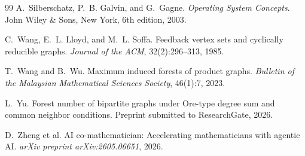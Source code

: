 \documentclass[a4paper]{amsart}
\begin{document}
\begin{thebibliography}{99}
A.~Silberschatz, P.~B. Galvin, and G.~Gagne.
\newblock \emph{Operating System Concepts}.
\newblock John Wiley \& Sons, New York, 6th edition, 2003.

C.~Wang, E.~L. Lloyd, and M.~L. Soffa.
\newblock Feedback vertex sets and cyclically reducible graphs.
\newblock \emph{Journal of the ACM}, 32(2):296--313, 1985.

T.~Wang and B.~Wu.
\newblock Maximum induced forests of product graphs.
\newblock \emph{Bulletin of the Malaysian Mathematical Sciences Society}, 46(1):7, 2023.

L.~Yu.
\newblock Forest number of bipartite graphs under Ore-type degree sum and common neighbor conditions.
\newblock Preprint submitted to ResearchGate, 2026.

D.~Zheng et al.
\newblock AI co-mathematician: Accelerating mathematicians with agentic AI.
\newblock \emph{arXiv preprint arXiv:2605.06651}, 2026.

\end{thebibliography}
\end{document}
